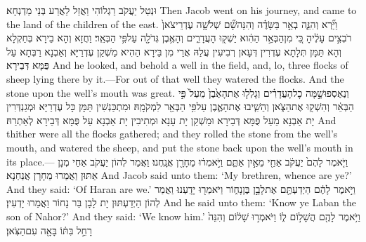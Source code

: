 {וּנְטַל יַעֲקֹב רַגְלוֹהִי וַאֲזַל לַאֲרַע בְּנֵי מַדְנְחָא׃}
{Then Jacob went on his journey, and came to the land of the children of the east.}{}
{וַיַּ֞רְא וְהִנֵּ֧ה בְאֵ֣ר בַּשָּׂדֶ֗ה וְהִנֵּה\maqqaf שָׁ֞ם שְׁלֹשָׁ֤ה עֶדְרֵי\maqqaf צֹאן֙ רֹבְצִ֣ים עָלֶ֔יהָ כִּ֚י מִן\maqqaf הַבְּאֵ֣ר הַהִ֔וא יַשְׁק֖וּ הָעֲדָרִ֑ים וְהָאֶ֥בֶן גְּדֹלָ֖ה עַל\maqqaf פִּ֥י הַבְּאֵֽר׃}
{וַחֲזָא וְהָא בֵירָא בְּחַקְלָא וְהָא תַּמָּן תְּלָתָא עֶדְרִין דְּעָאן רְבִיעִין עֲלַהּ אֲרֵי מִן בֵּירָא הַהִיא מַשְׁקַן עֶדְרַיָּא וְאַבְנָא רַבְּתָא עַל פֻּמָּא דְּבֵירָא׃}
{And he looked, and behold a well in the field, and, lo, three flocks of sheep lying there by it.—For out of that well they watered the flocks. And the stone upon the well’s mouth was great.}{}
{וְנֶאֶסְפוּ\maqqaf שָׁ֣מָּה כׇל\maqqaf הָעֲדָרִ֗ים וְגָלְל֤וּ אֶת\maqqaf הָאֶ֙בֶן֙ מֵעַל֙ פִּ֣י הַבְּאֵ֔ר וְהִשְׁק֖וּ אֶת\maqqaf הַצֹּ֑אן וְהֵשִׁ֧יבוּ אֶת\maqqaf הָאֶ֛בֶן עַל\maqqaf פִּ֥י הַבְּאֵ֖ר לִמְקֹמָֽהּ׃}
{וּמִתְכַּנְשִׁין תַּמָּן כָּל עֶדְרַיָּא וּמְגַנְדְּרִין יָת אַבְנָא מֵעַל פֻּמָּא דְּבֵירָא וּמַשְׁקַן יָת עָנָא וּמְתִיבִין יָת אַבְנָא עַל פֻּמָּא דְּבֵירָא לְאַתְרַהּ׃}
{And thither were all the flocks gathered; and they rolled the stone from the well’s mouth, and watered the sheep, and put the stone back upon the well’s mouth in its place.—}{}
{וַיֹּ֤אמֶר לָהֶם֙ יַעֲקֹ֔ב אַחַ֖י מֵאַ֣יִן אַתֶּ֑ם וַיֹּ֣אמְר֔וּ מֵחָרָ֖ן אֲנָֽחְנוּ׃}
{וַאֲמַר לְהוֹן יַעֲקֹב אַחַי מְנָן אַתּוּן וַאֲמַרוּ מֵחָרָן אֲנַחְנָא׃}
{And Jacob said unto them: ‘My brethren, whence are ye?’ And they said: ‘Of Haran are we.’}{}
{וַיֹּ֣אמֶר לָהֶ֔ם הַיְדַעְתֶּ֖ם אֶת\maqqaf לָבָ֣ן בֶּן\maqqaf נָח֑וֹר וַיֹּאמְר֖וּ יָדָֽעְנוּ׃}
{וַאֲמַר לְהוֹן הַיְדַעְתּוּן יָת לָבָן בַּר נָחוֹר וַאֲמַרוּ יָדְעִין׃}
{And he said unto them: ‘Know ye Laban the son of Nahor?’ And they said: ‘We know him.’}{}
{וַיֹּ֥אמֶר לָהֶ֖ם הֲשָׁל֣וֹם ל֑וֹ וַיֹּאמְר֣וּ שָׁל֔וֹם וְהִנֵּה֙ רָחֵ֣ל בִּתּ֔וֹ בָּאָ֖ה עִם\maqqaf הַצֹּֽאן׃}
